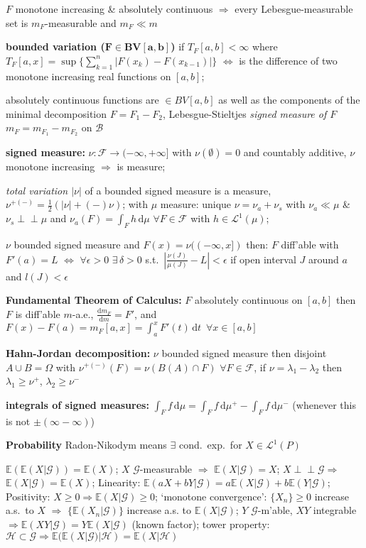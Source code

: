 \documentclass[8pt,twoside]{extarticle}
\newcommand{\indep}{\perp \!\!\! \perp}
\begin{document}
\begin{multicols}{2}
$F$ monotone increasing \& absolutely continuous $\Rightarrow$ every Lebesgue-measurable set is $m_F$-measurable and $m_F \ll m$

\textbf{bounded variation ($\boldsymbol{F \in BV[a,b]}$)} if $T_F[a,b] <\infty$ where $T_F[a,x]=\sup \{\sum_{k=1}^n|F(x_k)-F(x_{k-1})|\}$ $\Leftrightarrow$ is the difference of two monotone increasing real functions on $[a,b]$;

absolutely continuous functions are $\in BV[a,b]$ as well as the components of the minimal decomposition  $F=F_1-F_2$, Lebesgue-Stieltjes \textit{signed measure of $F$} $m_F=m_{F_1}-m_{F_2}$ on $\mathcal{B}$

\textbf{signed measure:} $\nu:\mathcal{F}\to (-\infty,+\infty]$ with $\nu(\emptyset)=0$ and countably additive, $\nu$ monotone increasing $\Rightarrow$ is measure;

\textit{total variation $|\nu|$} of a bounded signed measure is a measure, $\nu^{+(-)}=\frac{1}{2} (|\nu| {+}(-) \nu)$; with $\mu$ measure: unique $\nu=\nu_a + \nu_s$ with $\nu_a\ll\mu$ \& $\nu_s\indep \mu$ and $\nu_a(F)=\int_Fh\,\mathrm{d}\mu \,\,\forall F{\in}\mathcal{F}$ with $h\in \mathcal{L}^1(\mu)$;

$\nu$ bounded signed measure and $F(x)=\nu((-\infty,x])$ then: $F$ diff'able with $F'(a)=L$ $\Leftrightarrow$ $\forall \epsilon{>}0\,\, \exists \,\delta {>} 0$ s.t.\ $|\frac{\nu(J)}{\mu(J)} - L|<\epsilon$ if open interval $J$ around $a$ and $l(J)<\epsilon$

\textbf{Fundamental Theorem of Calculus:} $F$ absolutely continuous on $[a,b]$ then $F$ is diff'able $m$-a.e., $\frac{\mathrm{d}m_F}{\mathrm{d}m} = F'$, and $F(x)-F(a) = m_F[a,x]=\int_a^x F'(t)\,\mathrm{d}t \,\,\, \forall x\in[a,b]$

\textbf{Hahn-Jordan decomposition:} $\nu$ bounded signed measure then disjoint $A\cup B=\Omega$ with $\nu^{+(-)}(F)=\nu(B(A)\cap F) \,\,\forall F{\in}\mathcal{F}$,
 if $\nu=\lambda_1-\lambda_2$ then $\lambda_1\geq \nu^+$, $\lambda_2\geq \nu^-$
 
\textbf{integrals of signed measures:} $\int_F f \,\mathrm{d}\mu = \int_F f \,\mathrm{d}\mu^+ - \int_F f \,\mathrm{d}\mu^-$ (whenever this is not $\pm(\infty-\infty)$)

\textbf{Probability} Radon-Nikodym means $\exists$ cond.\ exp.\ for $X\in \mathcal{L}^1(P)$

$\mathbb{E}(\mathbb{E}(X|\mathcal{G}))=\mathbb{E}(X)$; 
$X$ $\mathcal{G}$-measurable $\Rightarrow$ $\mathbb{E}(X|\mathcal{G})=X$; 
$X\indep \mathcal{G} \Rightarrow$ $\mathbb{E}(X|\mathcal{G})=\mathbb{E}(X)$; 
Linearity: $\mathbb{E}(aX+bY|\mathcal{G}) = a\mathbb{E}(X|\mathcal{G}) + b\mathbb{E}(Y|\mathcal{G})$; 
Positivity: $X \geq 0 \Rightarrow\mathbb{E}(X|\mathcal{G})\geq 0$; 
`monotone convergence': $\{X_n\}\geq 0$ increase a.s.\ to $X$ $\Rightarrow$ $\{\mathbb{E}(X_n|\mathcal{G})\}$ increase a.s. to $\mathbb{E}(X|\mathcal{G})$; $Y$ $\mathcal{G}$-m'able, $XY$ integrable $\Rightarrow \mathbb{E}(XY|\mathcal{G}) = Y\mathbb{E}(X|\mathcal{G})$ (known factor); tower property: $\mathcal{H}{\subset}\mathcal{G} \Rightarrow \mathbb{E}(\mathbb{E}(X|\mathcal{G})|\mathcal{H})=\mathbb{E}(X|\mathcal{H})$


\end{multicols}
\end{document}
